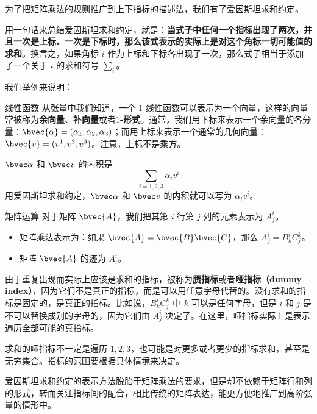 为了把矩阵乘法的规则推广到上下指标的描述法，我们有了爱因斯坦求和约定。

用一句话来总结爱因斯坦求和约定，就是：\textbf{当式子中任何一个指标出现了两次，并且一次是上标、一次是下标时，那么该式表示的实际上是对这个角标一切可能值的求和}。换言之，如果角标 $i$ 作为上标和下标各出现了一次，那么式子相当于添加了一个关于 $i$ 的求和符号 $\sum_i$。

我们举例来说明：

\begin{example}{线性函数}
从张量中我们知道，一个 $1$-线性函数可以表示为一个向量，这样的向量常被称为\textbf{余向量}、\textbf{补向量}或者\textbf{$1$-形式}。通常，我们用下标来表示一个余向量的各分量：$\bvec{\alpha}=(\alpha_1, \alpha_2, \alpha_3)$；而用上标来表示一个通常的几何向量：$\bvec{v}=(v^1, v^2, v^3)$。注意，上标不是乘方。

$\bvec\alpha$ 和 $\bvec v$ 的内积是$$\sum\limits_{i=1, 2, 3}\alpha_i v^i$$
用爱因斯坦求和约定，$\bvec\alpha$ 和 $\bvec v$ 的内积就可以写为 $\alpha_i v^i$。
\end{example}

\begin{example}{矩阵运算}
对于矩阵 $\bvec{A}$，我们把其第 $i$ 行第 $j$ 列的元素表示为 $A^i_j$。
\begin{itemize}
\item 矩阵乘法表示为：如果 $\bvec{A}=\bvec{B}\bvec{C}$，那么 $A^i_j=B^i_k C^k_j$。
\item 矩阵 $\bvec{A}$ 的迹为 $A^i_i$。

\end{itemize}
\end{example}

由于重复出现而实际上应该是求和的指标，被称为\textbf{赝指标}或者\textbf{哑指标（dummy index）}，因为它们不是真正的指标，而是可以用任意字母代替的。没有求和的指标是固定的，是真正的指标。比如说，$B^i_k C^k_j$ 中 $k$ 可以是任何字母，但是 $i$ 和 $j$ 是不可以替换成别的字母的，因为它们由 $A^i_j$ 决定了。在这里，哑指标实际上是表示遍历全部可能的真指标。

求和的哑指标不一定是遍历 $1, 2, 3$，也可能是对更多或者更少的指标求和，甚至是无穷集合。指标的范围要根据具体情境来决定。

爱因斯坦求和约定的表示方法脱胎于矩阵乘法的要求，但是却不依赖于矩阵行和列的形式，转而关注指标间的配合，相比传统的矩阵表达，能更方便地推广到高阶张量的情形中。


